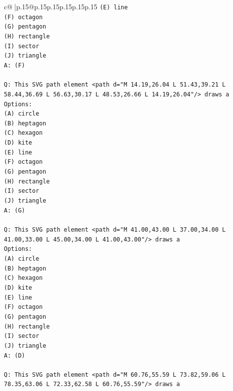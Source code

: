 \documentclass{article}
\begin{document}
{\begin{supertabular}{c@{$\;$}|p{.15\linewidth}@{}p{.15\linewidth}p{.15\linewidth}p{.15\linewidth}p{.15\linewidth}p{.15\linewidth}}
{{{\texttt{(E) line} \\
\texttt{(F) octagon} \\
\texttt{(G) pentagon} \\
\texttt{(H) rectangle} \\
\texttt{(I) sector} \\
\texttt{(J) triangle} \\
\texttt{A: (F)} \\
\\ 
\texttt{Q: This SVG path element <path d="M 14.19,26.04 L 51.43,39.21 L 58.44,36.69 L 56.63,30.17 L 48.53,26.66 L 14.19,26.04"/> draws a} \\
\texttt{Options:} \\
\texttt{(A) circle} \\
\texttt{(B) heptagon} \\
\texttt{(C) hexagon} \\
\texttt{(D) kite} \\
\texttt{(E) line} \\
\texttt{(F) octagon} \\
\texttt{(G) pentagon} \\
\texttt{(H) rectangle} \\
\texttt{(I) sector} \\
\texttt{(J) triangle} \\
\texttt{A: (G)} \\
\\ 
\texttt{Q: This SVG path element <path d="M 41.00,43.00 L 37.00,34.00 L 41.00,33.00 L 45.00,34.00 L 41.00,43.00"/> draws a} \\
\texttt{Options:} \\
\texttt{(A) circle} \\
\texttt{(B) heptagon} \\
\texttt{(C) hexagon} \\
\texttt{(D) kite} \\
\texttt{(E) line} \\
\texttt{(F) octagon} \\
\texttt{(G) pentagon} \\
\texttt{(H) rectangle} \\
\texttt{(I) sector} \\
\texttt{(J) triangle} \\
\texttt{A: (D)} \\
\\ 
\texttt{Q: This SVG path element <path d="M 60.76,55.59 L 73.82,59.06 L 78.35,63.06 L 72.33,62.58 L 60.76,55.59"/> draws a} \\
}}}
\end{supertabular}}
\end{document}
